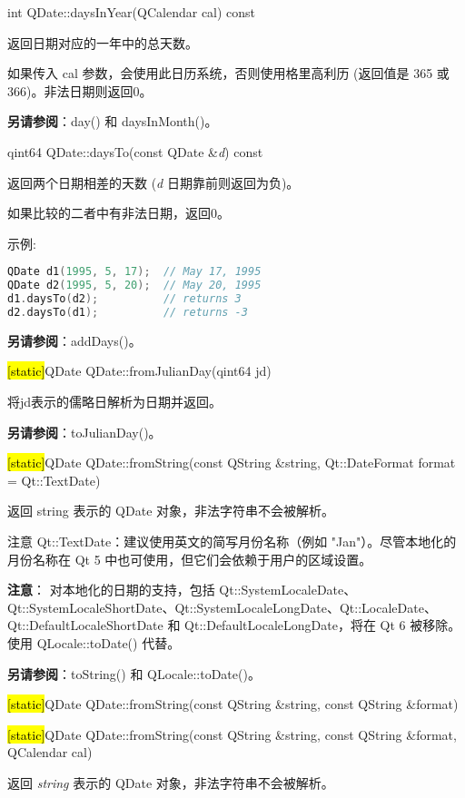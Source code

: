 int QDate::daysInYear(QCalendar cal) const

返回日期对应的一年中的总天数。

如果传入 cal 参数，会使用此日历系统，否则使用格里高利历 (返回值是 365 或 366)。非法日期则返回0。

\textbf{另请参阅}：day() 和 daysInMonth()。

\splitLine

qint64 QDate::daysTo(const QDate \&\emph{d}) const

返回两个日期相差的天数 (\emph{d} 日期靠前则返回为负)。

如果比较的二者中有非法日期，返回0。

示例:

\begin{lstlisting}[language=C++]
QDate d1(1995, 5, 17);  // May 17, 1995
QDate d2(1995, 5, 20);  // May 20, 1995
d1.daysTo(d2);          // returns 3
d2.daysTo(d1);          // returns -3
\end{lstlisting}

\textbf{另请参阅}：addDays()。

\splitLine

\hl{[static]}QDate QDate::fromJulianDay(qint64 jd)

将jd表示的儒略日解析为日期并返回。

\textbf{另请参阅}：toJulianDay()。

\splitLine

\hl{[static]}QDate QDate::fromString(const QString \&string,
Qt::DateFormat format = Qt::TextDate)

返回 string 表示的 QDate 对象，非法字符串不会被解析。

注意 Qt::TextDate：建议使用英文的简写月份名称（例如 "Jan"）。尽管本地化的月份名称在 Qt 5 中也可使用，但它们会依赖于用户的区域设置。

\textbf{注意}： 对本地化的日期的支持，包括 Qt::SystemLocaleDate、Qt::SystemLocaleShortDate、Qt::SystemLocaleLongDate、Qt::LocaleDate、Qt::DefaultLocaleShortDate 和 Qt::DefaultLocaleLongDate，将在 Qt 6 被移除。使用 QLocale::toDate() 代替。

\textbf{另请参阅}：toString() 和 QLocale::toDate()。

\splitLine

\hl{[static]}QDate QDate::fromString(const QString \&string, const QString
\&format)

\hl{[static]}QDate QDate::fromString(const QString \&string, const QString
\&format, QCalendar cal)

返回 \emph{string}  表示的 QDate 对象，非法字符串不会被解析。

